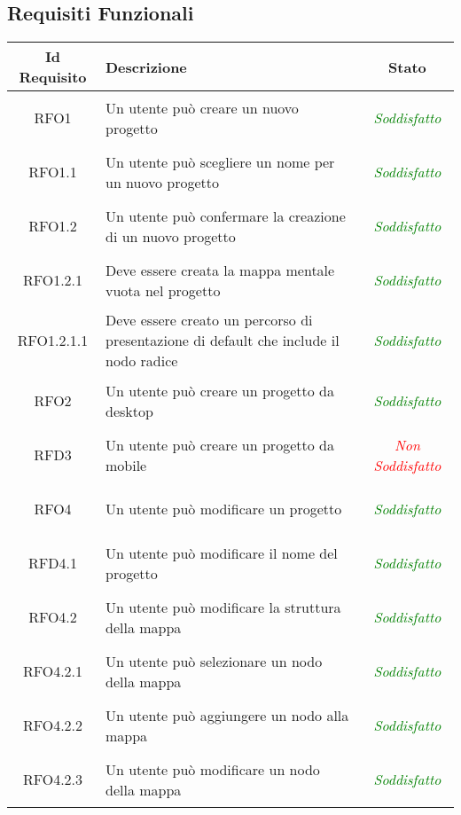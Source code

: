 \subsection{Requisiti Funzionali}
\normalsize
\begin{longtable}{|c|>{\centering}m{7cm}|c|}
\hline
\textbf{Id Requisito} & \textbf{Descrizione} & \textbf{Stato}\\
\hline
\endhead
\hypertarget{RFO1}{RFO1} & Un utente può creare un nuovo progetto & \textcolor{Green}{\textit{Soddisfatto}}\\ \hline
\hypertarget{RFO1.1}{RFO1.1} & Un utente può scegliere un nome per un nuovo progetto & \textcolor{Green}{\textit{Soddisfatto}}\\ \hline
\hypertarget{RFO1.2}{RFO1.2} & Un utente può confermare la creazione di un nuovo progetto & \textcolor{Green}{\textit{Soddisfatto}}\\ \hline
\hypertarget{RFO1.2.1}{RFO1.2.1} & Deve essere creata la mappa mentale vuota nel progetto & \textcolor{Green}{\textit{Soddisfatto}}\\ \hline
\hypertarget{RFO1.2.1.1}{RFO1.2.1.1} & Deve essere creato un percorso di presentazione di default che include il nodo radice & \textcolor{Green}{\textit{Soddisfatto}}\\ \hline
\hypertarget{RFO2}{RFO2} & Un utente può creare un progetto da desktop & \textcolor{Green}{\textit{Soddisfatto}}\\ \hline
\hypertarget{RFD3}{RFD3} & Un utente può creare un progetto da mobile & \textcolor{Red}{\textit{Non Soddisfatto}}\\ \hline
\hypertarget{RFO4}{RFO4} & Un utente può modificare un progetto & \textcolor{Green}{\textit{Soddisfatto}}\\ \hline
\hypertarget{RFD4.1}{RFD4.1} & Un utente può modificare il nome del progetto & \textcolor{Green}{\textit{Soddisfatto}}\\ \hline
\hypertarget{RFO4.2}{RFO4.2} & Un utente può modificare la struttura della mappa & \textcolor{Green}{\textit{Soddisfatto}}\\ \hline
\hypertarget{RFO4.2.1}{RFO4.2.1} & Un utente può selezionare un nodo della mappa & \textcolor{Green}{\textit{Soddisfatto}}\\ \hline
\hypertarget{RFO4.2.2}{RFO4.2.2} & Un utente può aggiungere un nodo alla mappa & \textcolor{Green}{\textit{Soddisfatto}}\\ \hline
\hypertarget{RFO4.2.3}{RFO4.2.3} & Un utente può modificare un nodo della mappa & \textcolor{Green}{\textit{Soddisfatto}}\\ \hline

\end{longtable}
